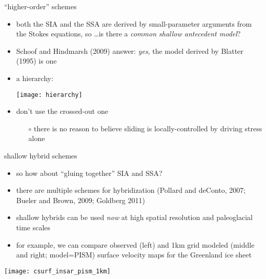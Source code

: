 \begin{frame}{``higher-order'' schemes}

\begin{itemize}
\item both the SIA and the SSA are derived by small-parameter arguments from the Stokes equations, so \dots is there a \emph{common shallow antecedent model}?
\item Schoof and Hindmarsh (2009) answer:  \emph{yes}, the model derived by Blatter (1995) is one
\item a hierarchy:
\begin{center}
\texttt{[image: hierarchy]}
\end{center}
\item don't use the crossed-out one
  \begin{itemize}
  \item[$\circ$] there is no reason to believe sliding is locally-controlled by driving stress alone
  \end{itemize}
\end{itemize}
\end{frame}


\begin{frame}{shallow hybrid schemes}

\begin{itemize}
\item so how about ``gluing together'' SIA and SSA?
\item there are multiple schemes for hybridization (Pollard and deConto, 2007; Bueler and Brown, 2009; Goldberg 2011)
\item shallow hybrids can be used \emph{now} at high spatial resolution and paleoglacial time scales
\item for example, we can compare observed (left) and 1km grid modeled (middle and right; model=PISM) surface velocity maps for the Greenland ice sheet
\end{itemize}

\vspace{-4mm}
\begin{center}
\texttt{[image: csurf\_insar\_pism\_1km]}
\end{center}
\end{frame}


